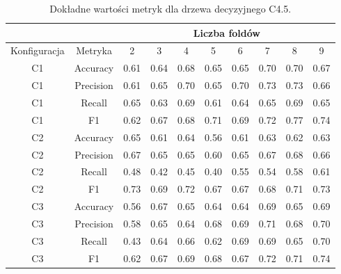 \begin{table}[H]
  \center
\begin{tabular}{|c|c|c|c|c|c|c|c|c|c|}  \hline
  \multicolumn{2}{|c|}{} & \multicolumn{8}{c|}{Liczba foldów} \\ \hline
Konfiguracja &    Metryka &     2 &     3 &     4 &     5 &     6 &     7 &     8 &     9 \\ \hline
          C1 &   Accuracy &  0.61 &  0.64 &  0.68 &  0.65 &  0.65 &  0.70 &  0.70 &  0.67 \\ \hline
          C1 &  Precision &  0.61 &  0.65 &  0.70 &  0.65 &  0.70 &  0.73 &  0.73 &  0.66 \\ \hline
          C1 &     Recall &  0.65 &  0.63 &  0.69 &  0.61 &  0.64 &  0.65 &  0.69 &  0.65 \\ \hline
          C1 &         F1 &  0.62 &  0.67 &  0.68 &  0.71 &  0.69 &  0.72 &  0.77 &  0.74 \\ \hline
          C2 &   Accuracy &  0.65 &  0.61 &  0.64 &  0.56 &  0.61 &  0.63 &  0.62 &  0.63 \\ \hline
          C2 &  Precision &  0.67 &  0.65 &  0.65 &  0.60 &  0.65 &  0.67 &  0.68 &  0.66 \\ \hline
          C2 &     Recall &  0.48 &  0.42 &  0.45 &  0.40 &  0.55 &  0.54 &  0.58 &  0.61 \\ \hline
          C2 &         F1 &  0.73 &  0.69 &  0.72 &  0.67 &  0.67 &  0.68 &  0.71 &  0.73 \\ \hline
          C3 &   Accuracy &  0.56 &  0.67 &  0.65 &  0.64 &  0.64 &  0.69 &  0.65 &  0.69 \\ \hline
          C3 &  Precision &  0.58 &  0.65 &  0.64 &  0.68 &  0.69 &  0.71 &  0.68 &  0.70 \\ \hline
          C3 &     Recall &  0.43 &  0.64 &  0.66 &  0.62 &  0.69 &  0.69 &  0.65 &  0.70 \\ \hline
          C3 &         F1 &  0.62 &  0.67 &  0.69 &  0.68 &  0.67 &  0.72 &  0.71 &  0.74 \\ \hline
\end{tabular}


  \caption{Dokładne wartości metryk dla drzewa decyzyjnego C4.5.}
\end{table}
